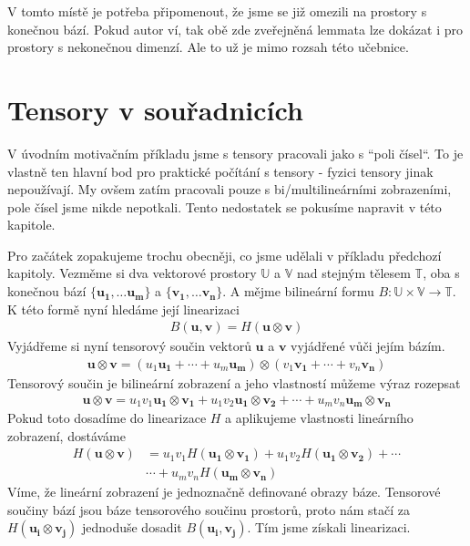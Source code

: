 \documentclass[a5paper,12pt]{amsbook}
\theoremstyle{definition}
\newcommand{\myvec}[1]{\bm{#1}}
\newcommand{\myspace}[1]{\mathbb{#1}}
\begin{document}
V tomto místě je potřeba připomenout, že jsme se již omezili na prostory s konečnou bází. Pokud
autor ví, tak obě zde zveřejněná lemmata lze dokázat i pro prostory s nekonečnou dimenzí. Ale to
už je mimo rozsah této učebnice.

\section{Tensory v souřadnicích}

\noindent
V úvodním motivačním příkladu jsme s tensory pracovali jako s ``poli čísel``. To je vlastně ten
hlavní bod pro praktické počítání s tensory - fyzici tensory jinak nepoužívají. My ovšem zatím
pracovali pouze s bi/multilineárními zobrazeními, pole čísel jsme nikde nepotkali. Tento nedostatek
se pokusíme napravit v této kapitole.

Pro začátek zopakujeme trochu obecněji, co jsme udělali v příkladu předchozí kapitoly. Vezměme si
dva vektorové prostory $\myspace{U}$ a $\myspace{V}$ nad stejným tělesem $\myspace{T}$, oba s konečnou
bází $\{\myvec{u_1},\hdots\myvec{u_m}\}$ a $\{\myvec{v_1},\hdots\myvec{v_n}\}$. A mějme bilineární
formu $B: \myspace{U}\times\myspace{V}\rightarrow\myspace{T}$. K této formě nyní hledáme její linearizaci
\begin{equation*}
\begin{split}
B(\myvec{u}, \myvec{v}) = H(\myvec{u}\otimes\myvec{v})
\end{split}
\end{equation*}
Vyjádřeme si nyní tensorový součin vektorů $\myvec{u}$ a $\myvec{v}$ vyjádřené vůči jejím bázím.
\begin{equation*}
\begin{split}
\myvec{u}\otimes\myvec{v} = \left(u_1\myvec{u_1} + \cdots + u_m\myvec{u_m}\right)\otimes\left(v_1\myvec{v_1} + \cdots + v_n\myvec{v_n}\right)
\end{split}
\end{equation*}
Tensorový součin je bilineární zobrazení a jeho vlastností můžeme výraz rozepsat
\begin{equation*}
\begin{split}
\myvec{u}\otimes\myvec{v} = u_1 v_1\myvec{u_1}\otimes\myvec{v_1} + u_1 v_2\myvec{u_1}\otimes\myvec{v_2} 
  + \cdots + u_m v_n\myvec{u_m}\otimes\myvec{v_n}
\end{split}
\end{equation*}
Pokud toto dosadíme do linearizace $H$ a aplikujeme vlastnosti lineárního zobrazení, dostáváme
\begin{equation*}
\begin{split}
H(\myvec{u}\otimes\myvec{v}) &= u_1 v_1H(\myvec{u_1}\otimes\myvec{v_1}) 
  + u_1 v_2H(\myvec{u_1}\otimes\myvec{v_2}) + \cdots \\
  &\cdots + u_m v_nH(\myvec{u_m}\otimes\myvec{v_n})
\end{split}
\end{equation*}
Víme, že lineární zobrazení je jednoznačně definované obrazy báze. Tensorové součiny bází
jsou báze tensorového součinu prostorů, proto nám stačí za $H(\myvec{u_i}\otimes\myvec{v_j})$
jednoduše dosadit $B(\myvec{u_i}, \myvec{v_j})$. Tím jsme získali linearizaci.
\end{document}
